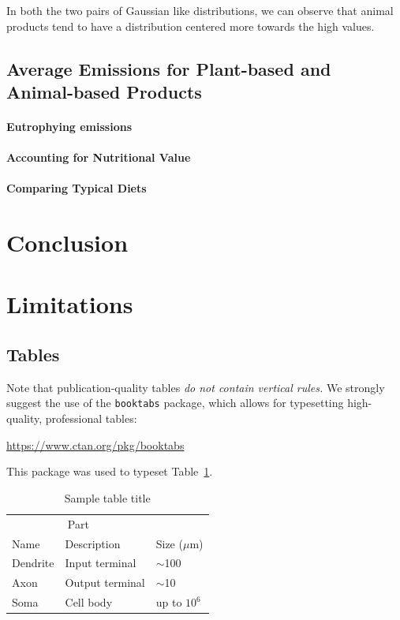 \documentclass{article}
\begin{document}
In both the two pairs of Gaussian like distributions, we can observe that animal products tend to have a distribution centered more towards the high values.

\subsection{Average Emissions for Plant-based and Animal-based Products}
\paragraph{Eutrophying emissions}
\paragraph{Accounting  for Nutritional Value}
\paragraph{Comparing Typical Diets}

\section{Conclusion}
\label{conclusion}


\section{Limitations}
\label{limitations}

\subsection{Tables}



Note that publication-quality tables \emph{do not contain vertical rules.} We
strongly suggest the use of the \verb+booktabs+ package, which allows for
typesetting high-quality, professional tables:
\begin{center}
  \url{https://www.ctan.org/pkg/booktabs}
\end{center}
This package was used to typeset Table~\ref{sample-table}.

\begin{table}
  \caption{Sample table title}
  \label{sample-table}
  \centering
  \begin{tabular}{lll}
    \toprule
    \multicolumn{2}{c}{Part}                   \\
    \cmidrule(r){1-2}
    Name     & Description     & Size ($\mu$m) \\
    \midrule
    Dendrite & Input terminal  & $\sim$100     \\
    Axon     & Output terminal & $\sim$10      \\
    Soma     & Cell body       & up to $10^6$  \\
    \bottomrule
  \end{tabular}
\end{table}
\end{document}
